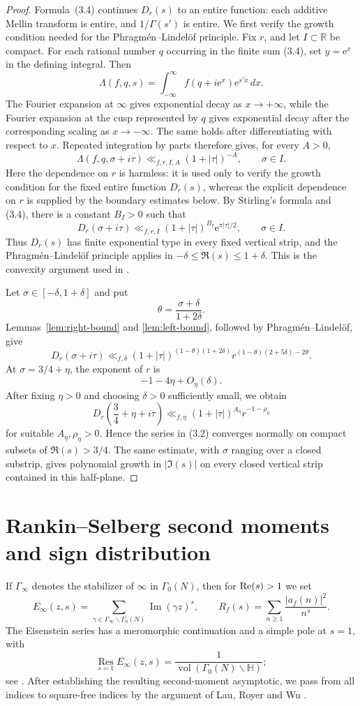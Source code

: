 \documentclass[11pt]{amsart}
\theoremstyle{remark}
\newcommand{\e}{\mathrm{e}}
\newcommand{\R}{\mathbb R}
\newcommand{\Hh}{\mathbb H}
\newcommand{\Res}{\operatorname*{Res}}
\newcommand{\vol}{\operatorname{vol}}
\begin{document}
\begin{proof}
Formula~(3.4) continues $D_r(s)$ to an entire function: each additive
Mellin transform is entire, and $1/\Gamma(s')$ is entire. We first verify
the growth condition needed for the Phragm\'en--Lindel\"of principle.
Fix $r$, and let $I\subset\R$ be compact. For each rational number $q$
occurring in the finite sum (3.4), set $y=\e^x$ in the defining integral.
Then
\[
\Lambda(f,q,s)
 =\int_{-\infty}^{\infty}
 f(q+i\e^x)\e^{s'x}\,dx.
\]
The Fourier expansion at $\infty$ gives exponential decay as
$x\to+\infty$, while the Fourier expansion at the cusp represented by
$q$ gives exponential decay after the corresponding scaling as
$x\to-\infty$. The same holds after differentiating with respect to $x$.
Repeated integration by parts therefore gives, for every $A>0$,
\[
\Lambda(f,q,\sigma+i\tau)
 \ll_{f,r,I,A}(1+|\tau|)^{-A},
 \qquad \sigma\in I.
\]
Here the dependence on $r$ is harmless: it is used only to verify the
growth condition for the fixed entire function $D_r(s)$, whereas the
explicit dependence on $r$ is supplied by the boundary estimates below.
By Stirling's formula and (3.4), there is a constant $B_I>0$ such that
\[
D_r(\sigma+i\tau)
 \ll_{f,r,I}(1+|\tau|)^{B_I}\e^{\pi|\tau|/2},
 \qquad \sigma\in I.
\]
Thus $D_r(s)$ has finite exponential type in every fixed vertical strip,
and the Phragm\'en--Lindel\"of principle applies in
$-\delta\le\Re(s)\le1+\delta$. This is the convexity argument used in
\cite[Section~4]{HKKL}.

Let $\sigma\in[-\delta,1+\delta]$ and put
\[
\theta=\frac{\sigma+\delta}{1+2\delta}.
\]
Lemmas~\ref{lem:right-bound} and \ref{lem:left-bound}, followed by
Phragm\'en--Lindel\"of, give
\[
D_r(\sigma+i\tau)
\ll_{f,\delta}
(1+|\tau|)^{(1-\theta)(1+2\delta)}
 r^{(1-\theta)(2+5\delta)-2\theta}.
\]
At $\sigma=3/4+\eta$, the exponent of $r$ is
\[
-1-4\eta+O_\eta(\delta).
\]
After fixing $\eta>0$ and choosing $\delta>0$ sufficiently small, we obtain
\[
D_r\left(\frac34+\eta+i\tau\right)
\ll_{f,\eta}(1+|\tau|)^{A_\eta}r^{-1-\rho_\eta}
\]
for suitable $A_\eta,\rho_\eta>0$. Hence the series in (3.2) converges
normally on compact subsets of $\Re(s)>3/4$. The same estimate, with
$\sigma$ ranging over a closed substrip, gives polynomial growth in
$|\Im(s)|$ on every closed vertical strip contained in this half-plane.
\end{proof}

\section{Rankin--Selberg second moments and sign distribution}\label{sec:second-moment}
If $\Gamma_\infty$ denotes the stabilizer of $\infty$ in $\Gamma_0(N)$, then
for ${\rm Re}(s)>1$ we set
\[
E_\infty(z,s)=
\sum_{\gamma\in\Gamma_\infty\backslash\Gamma_0(N)}
\operatorname{Im}(\gamma z)^s,
\qquad
R_f(s)=\sum_{n\ge1}\frac{|a_f(n)|^2}{n^s}.
\]
The Eisenstein series has a meromorphic continuation and a simple pole at
$s=1$, with
\[
\Res_{s=1}E_\infty(z,s)
=\frac{1}{\vol(\Gamma_0(N)\backslash\Hh)};
\]
see \cite[Chapter~6]{IwaniecSpectral}. After establishing the resulting
second-moment asymptotic, we pass from all indices to square-free indices
by the argument of Lau, Royer and Wu
\cite[Section~3]{LRW}.
\end{document}
